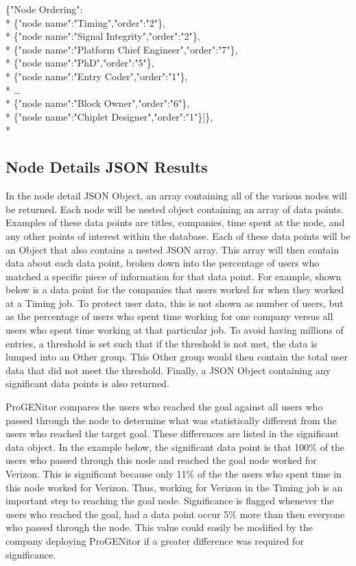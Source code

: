 \begin{tt}
\begin{footnotesize}
\noindent \{"Node Ordering":\\*
	\indent\{"node	name":"Timing","order":"2"\},\\*
	\indent\{"node name":"Signal Integrity","order":"2"\},\\*
	\indent\{"node name":"Platform Chief Engineer","order":"7"\},\\*
	\indent\{"node name":"PhD","order":"5"\},\\*
	\indent\{"node name":"Entry Coder","order":"1"\},\\*
	\indent\ldots\\*
	\indent\{"node name":"Block Owner","order":"6"\},\\*
	\indent\{"node name":"Chiplet Designer","order":"1"\}]\},\\*
\end{footnotesize}
\end{tt}

\subsection{Node Details JSON Results}
In the node detail JSON Object, an array containing all of the various nodes
will be returned.  Each node will be nested object containing an array of data
points.  Examples of these data points are titles, companies, time spent at the
node, and any other points of interest within the database.  Each of these data
points will be an Object that also contains a nested JSON array.  This array
will then contain data about each data point, broken down into the percentage of
users who matched a specific piece of information for that data point.  For
example, shown below is a data point for the companies that users worked for
when they worked at a Timing job.  To protect user data, this is not shown as
number of users, but as the percentage of users who spent time working for one
company versus all users who spent time working at that particular job.  To
avoid having millions of entries, a threshold is set such that if the threshold
is not met, the data is lumped into an Other group.  This Other group would then
contain the total user data that did not meet the threshold.  Finally, a JSON
Object containing any significant data points is also returned.  

ProGENitor compares the users who reached the goal against all users who passed
through the node to determine what was statistically different from the users
who reached the target goal.  These differences are listed in the significant
data object. In the example below, the significant data point is that 100\% of
the users who passed through this node and reached the goal node worked for
Verizon.  This is significant because only 11\% of the the users who spent time
in this node worked for Verizon.  Thus, working for Verizon in the Timing job is
an important step to reaching the goal node.  Significance is flagged whenever
the users who reached the goal, had a data point occur 5\% more than then
everyone who passed through the node.  This value could easily be modified by
the company deploying ProGENitor if a greater difference was required for significance.

